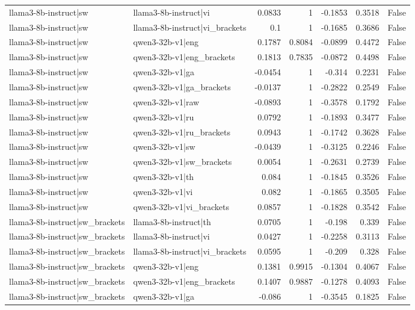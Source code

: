 \begin{table}
\begin{tabular}{l l r r r r l}
llama3-8b-instruct|sw & llama3-8b-instruct|vi & 0.0833 & 1 & -0.1853 & 0.3518 & False \\
llama3-8b-instruct|sw & llama3-8b-instruct|vi_brackets & 0.1 & 1 & -0.1685 & 0.3686 & False \\
llama3-8b-instruct|sw & qwen3-32b-v1|eng & 0.1787 & 0.8084 & -0.0899 & 0.4472 & False \\
llama3-8b-instruct|sw & qwen3-32b-v1|eng_brackets & 0.1813 & 0.7835 & -0.0872 & 0.4498 & False \\
llama3-8b-instruct|sw & qwen3-32b-v1|ga & -0.0454 & 1 & -0.314 & 0.2231 & False \\
llama3-8b-instruct|sw & qwen3-32b-v1|ga_brackets & -0.0137 & 1 & -0.2822 & 0.2549 & False \\
llama3-8b-instruct|sw & qwen3-32b-v1|raw & -0.0893 & 1 & -0.3578 & 0.1792 & False \\
llama3-8b-instruct|sw & qwen3-32b-v1|ru & 0.0792 & 1 & -0.1893 & 0.3477 & False \\
llama3-8b-instruct|sw & qwen3-32b-v1|ru_brackets & 0.0943 & 1 & -0.1742 & 0.3628 & False \\
llama3-8b-instruct|sw & qwen3-32b-v1|sw & -0.0439 & 1 & -0.3125 & 0.2246 & False \\
llama3-8b-instruct|sw & qwen3-32b-v1|sw_brackets & 0.0054 & 1 & -0.2631 & 0.2739 & False \\
llama3-8b-instruct|sw & qwen3-32b-v1|th & 0.084 & 1 & -0.1845 & 0.3526 & False \\
llama3-8b-instruct|sw & qwen3-32b-v1|vi & 0.082 & 1 & -0.1865 & 0.3505 & False \\
llama3-8b-instruct|sw & qwen3-32b-v1|vi_brackets & 0.0857 & 1 & -0.1828 & 0.3542 & False \\
llama3-8b-instruct|sw_brackets & llama3-8b-instruct|th & 0.0705 & 1 & -0.198 & 0.339 & False \\
llama3-8b-instruct|sw_brackets & llama3-8b-instruct|vi & 0.0427 & 1 & -0.2258 & 0.3113 & False \\
llama3-8b-instruct|sw_brackets & llama3-8b-instruct|vi_brackets & 0.0595 & 1 & -0.209 & 0.328 & False \\
llama3-8b-instruct|sw_brackets & qwen3-32b-v1|eng & 0.1381 & 0.9915 & -0.1304 & 0.4067 & False \\
llama3-8b-instruct|sw_brackets & qwen3-32b-v1|eng_brackets & 0.1407 & 0.9887 & -0.1278 & 0.4093 & False \\
llama3-8b-instruct|sw_brackets & qwen3-32b-v1|ga & -0.086 & 1 & -0.3545 & 0.1825 & False \\

\end{tabular}
\end{table}
